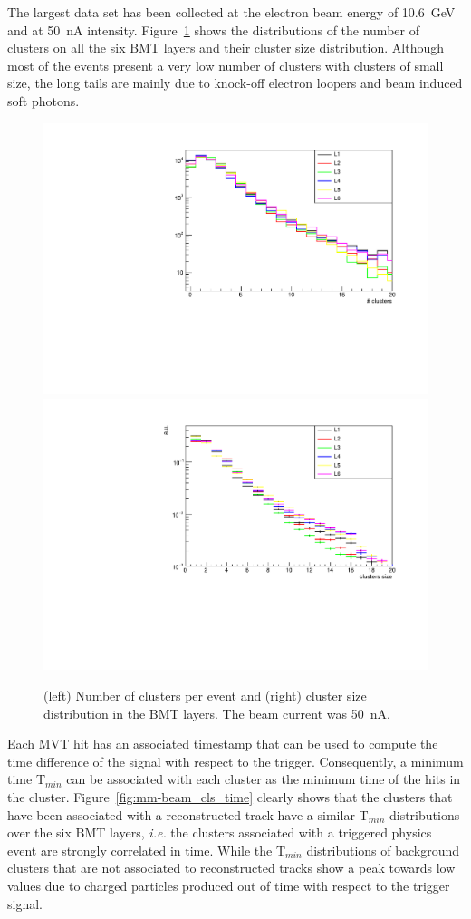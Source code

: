 The largest data set has been collected at the electron beam energy of 10.6~GeV and at 50~nA intensity. Figure~\ref{fig:mm-beam_cls} shows the distributions of the number of clusters on all the six BMT layers and their cluster size distribution. Although most of the events present a very low number of clusters with clusters of small size, the long tails are mainly due to knock-off electron loopers and beam induced soft photons.

\begin{figure}[htb]
 \includegraphics[width=.49\columnwidth,keepaspectratio]{images/beam_num_cls.pdf}
 \includegraphics[width=.49\columnwidth,keepaspectratio]{images/beam_cls_size.pdf}
 \caption{(left) Number of clusters per event and (right) cluster size distribution in the BMT layers. The beam current was 50~nA.}
 \label{fig:mm-beam_cls}
\end{figure}

Each MVT hit has an associated timestamp that can be used to compute the time difference of the signal with respect to the trigger. Consequently, a minimum time T$_{min}$ can be associated with each cluster as the minimum time of the hits in the cluster. Figure~\ref{fig:mm-beam_cls_time} clearly shows that the clusters that have been associated with a reconstructed track have a similar T$_{min}$ distributions over the six BMT layers, \emph{i.e.} the clusters associated with a triggered physics event are strongly correlated in time. While the T$_{min}$ distributions of background clusters that are not associated to reconstructed tracks show a peak towards low values due to charged particles produced out of time with respect to the trigger signal.

